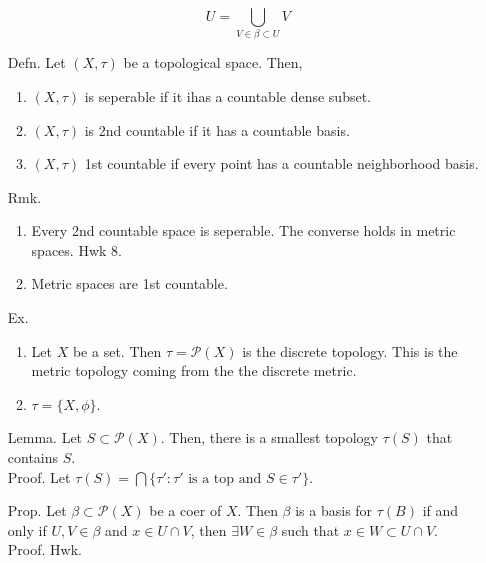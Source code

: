 \documentclass[12pt]{article}
\begin{document}
\begin{itemize}
    \[ U = \bigcup_{V \in \beta \subset U} V\]
    \item[Defn.] Let $(X, \tau)$ be a topological space. Then, 
    \begin{enumerate}
        \item $(X, \tau)$ is seperable if it ihas a countable dense subset. 
        \item $(X, \tau)$ is 2nd countable if it has a countable basis.
        \item $(X, \tau)$ 1st countable if every point has a countable neighborhood basis.
    \end{enumerate}
    \item[Rmk.] \begin{enumerate}
        \item Every 2nd countable space is seperable. The converse holds in metric spaces. Hwk 8. 
        \item Metric spaces are 1st countable. 
    \end{enumerate}
    \item[Ex.] \begin{enumerate}
        \item Let $X$ be a set. Then $\tau = \mathcal{P}(X)$ is the discrete topology. This is the metric topology coming from the the discrete metric. 
        \item $\tau = \{X, \phi\}$. 
    \end{enumerate}
    \item[Lemma.] Let $S \subset \mathcal{P}(X)$. Then, there is a smallest topology $\tau(S)$ that contains $S$. \\
    Proof. Let $\tau(S) = \bigcap\{\tau' : \tau' \text{ is a top and } S \in \tau'\}$. 
    \item[Prop.] Let $\beta \subset \mathcal{P}(X)$ be a coer of $X$. Then $\beta$ is a basis for $\tau(B)$ if and only if $U, V \in \beta$ and $x \in U \cap V$, then $\exists W \in \beta$ such that $x \in W \subset U \cap V$. \\
    Proof. Hwk. 
\end{itemize}
\end{document}

